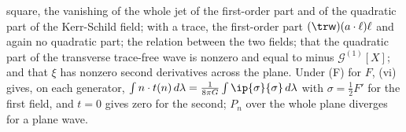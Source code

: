 square, the vanishing of the whole jet of the first-order part and of the quadratic part of the Kerr-Schild field; with a trace, the first-order part $(\tr\mathsf{w})(a \cdot \ell)\ell$ and again no quadratic part; the relation between the two fields; that the quadratic part of the transverse trace-free wave is nonzero and equal to minus $\mathcal{G}^{(1)}[X]$; and that $\xi$ has nonzero second derivatives across the plane. Under (F) for $F$, (vi) gives, on each generator, $\int n \cdot t(n)\,d\lambda = \tfrac{1}{8\pi G}\int\ip{\sigma}{\sigma}\,d\lambda$ with $\sigma = \tfrac12 F'$ for the first field, and $t = 0$ gives zero for the second; $P_{n}$ over the whole plane diverges for a plane wave.
